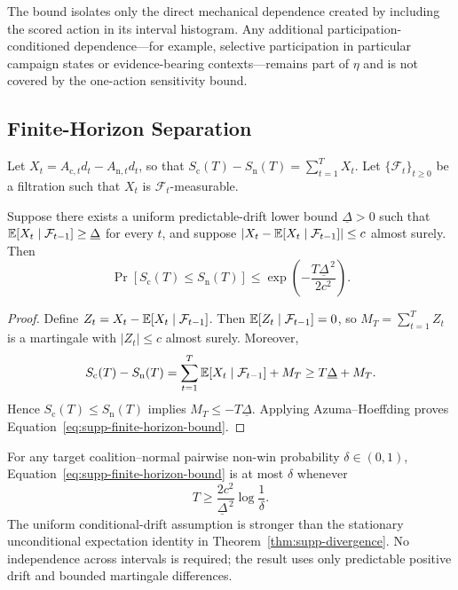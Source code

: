 The bound isolates only the direct mechanical dependence created by including
the scored action in its interval histogram. Any additional
participation-conditioned dependence---for example, selective participation
in particular campaign states or evidence-bearing contexts---remains part of
$\eta$ and is not covered by the one-action sensitivity bound.

\subsection{Finite-Horizon Separation}
\label{sec:supp-concentration}

Let $X_t=A_{\mathrm c,t}d_t-A_{\mathrm n,t}d_t$, so that
$S_{\mathrm c}(T)-S_{\mathrm n}(T)=\sum_{t=1}^{T}X_t$.
Let $\{\mathcal F_t\}_{t\geq0}$ be a filtration such that $X_t$ is
$\mathcal F_t$-measurable.

\begin{corollary}
\label{cor:supp-finite}
Suppose there exists a uniform predictable-drift lower bound
$\underline{\Delta}>0$ such that
$\mathbb{E}[X_t\mid\mathcal F_{t-1}]\geq\underline{\Delta}$ for every $t$,
and suppose
$\left|X_t-\mathbb{E}[X_t\mid\mathcal F_{t-1}]\right|\leq c$
almost surely. Then
\begin{equation}
\label{eq:supp-finite-horizon-bound}
\Pr\!\left[
S_{\mathrm c}(T)\leq S_{\mathrm n}(T)
\right]
\leq
\exp\!\left(
-\frac{T\underline{\Delta}^{\,2}}{2c^2}
\right).
\end{equation}
\end{corollary}

\begin{proof}
Define
$Z_t=X_t-\mathbb{E}[X_t\mid\mathcal F_{t-1}]$.
Then $\mathbb{E}[Z_t\mid\mathcal F_{t-1}]=0$, so
$M_T=\sum_{t=1}^{T}Z_t$ is a martingale with $|Z_t|\leq c$
almost surely. Moreover,
\[
S_{\mathrm c}(T)-S_{\mathrm n}(T)
=
\sum_{t=1}^{T}\mathbb{E}[X_t\mid\mathcal F_{t-1}]
+
M_T
\geq
T\underline{\Delta}+M_T.
\]
Hence $S_{\mathrm c}(T)\leq S_{\mathrm n}(T)$ implies
$M_T\leq-T\underline{\Delta}$. Applying Azuma--Hoeffding proves
Equation~\eqref{eq:supp-finite-horizon-bound}.
\end{proof}

For any target coalition--normal pairwise non-win probability
$\delta\in(0,1)$, Equation~\eqref{eq:supp-finite-horizon-bound} is at
most $\delta$ whenever
\begin{equation}
\label{eq:supp-monitoring-horizon}
T
\geq
\frac{2c^2}{\underline{\Delta}^{\,2}}
\log\frac{1}{\delta}.
\end{equation}
The uniform conditional-drift assumption is stronger than the
stationary unconditional expectation identity in
Theorem~\ref{thm:supp-divergence}. No independence across intervals is
required; the result uses only predictable positive drift and bounded
martingale differences.

